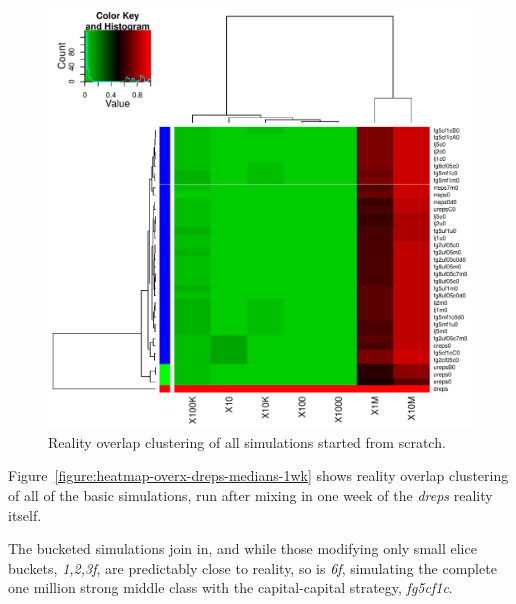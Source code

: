 \documentclass[10pt,oneside]{memoir}
\begin{document}
\begin{Spacing}{2}
\begin{figure}
\begin{center}
    \includegraphics{figures/crop/heatmap-overx-dreps-medians-0wk}
    \caption{Reality overlap clustering of all simulations started from scratch.}
    \label{figure:heatmap-overx-dreps-medians-0wk}
\end{center}
\end{figure}
Figure~\ref{figure:heatmap-overx-dreps-medians-1wk} shows reality overlap clustering of all of the basic simulations, run after mixing in one week of the {\itshape dreps} reality itself.


The bucketed simulations join in, and while those modifying only small elice buckets, {\itshape {1,2,3}f}, are predictably close to reality, so is {\itshape 6f}, simulating the complete one million strong middle class with the capital-capital strategy, {\itshape fg5cf1c}.




\end{Spacing}
\end{document}
